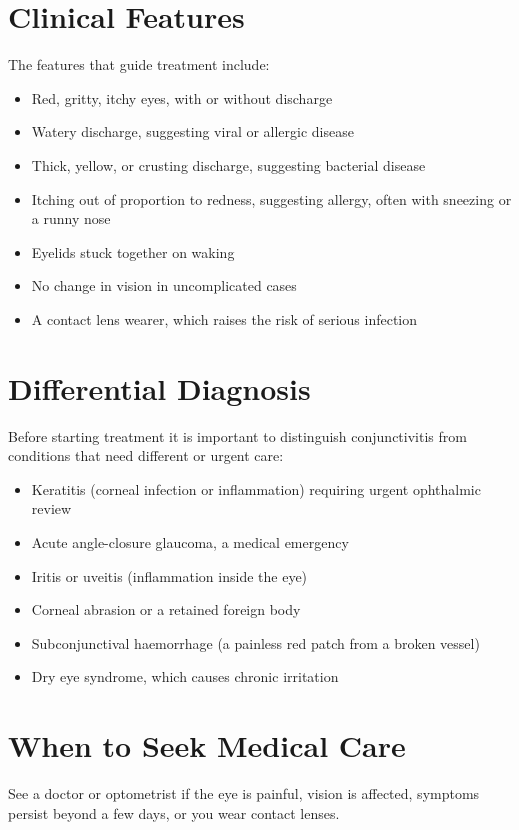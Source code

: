\section*{Clinical Features}
The features that guide treatment include:
\begin{itemize}
    \item Red, gritty, itchy eyes, with or without discharge
    \item Watery discharge, suggesting viral or allergic disease
    \item Thick, yellow, or crusting discharge, suggesting bacterial disease
    \item Itching out of proportion to redness, suggesting allergy, often with sneezing or a runny nose
    \item Eyelids stuck together on waking
    \item No change in vision in uncomplicated cases
    \item A contact lens wearer, which raises the risk of serious infection
\end{itemize}

\section*{Differential Diagnosis}
Before starting treatment it is important to distinguish conjunctivitis from conditions that need different or urgent care:
\begin{itemize}
    \item Keratitis (corneal infection or inflammation) requiring urgent ophthalmic review
    \item Acute angle-closure glaucoma, a medical emergency
    \item Iritis or uveitis (inflammation inside the eye)
    \item Corneal abrasion or a retained foreign body
    \item Subconjunctival haemorrhage (a painless red patch from a broken vessel)
    \item Dry eye syndrome, which causes chronic irritation
\end{itemize}

\section*{When to Seek Medical Care}
See a doctor or optometrist if the eye is painful, vision is affected, symptoms persist beyond a few days, or you wear contact lenses.

